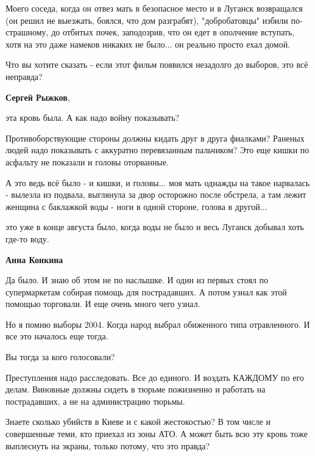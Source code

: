 \begin{itemize}
\begin{itemize}
Моего соседа, когда он отвез мать в безопасное место и в Луганск возвращался
(он решил не выезжать, боялся, что дом разграбят), "добробатовцы" избили
по-страшному, до отбитых почек, заподозрив, что он едет в ополчение вступать,
хотя на это даже намеков никаких не было... он реально просто ехал домой. 

Что вы хотите сказать - если этот фильм появился незадолго до выборов, это всё
неправда?

 
\textbf{Сергей Рыжков}, 

эта кровь была. А как надо войну показывать?

Противоборствующие стороны должны кидать друг в друга фиалками? Раненых людей
надо показывать с аккуратно перевязанным пальчиком? Это еще кишки по асфальту
не показали и головы оторванные. 

А это ведь всё было - и кишки, и головы... моя мать однажды на такое нарвалась
- вылезла из подвала, выглянула за двор осторожно после обстрела, а там лежит
женщина с баклажкой воды - ноги в одной стороне, голова в другой... 

это уже в конце августа было, когда воды не было и весь Луганск добывал хоть
где-то воду.

 
\textbf{Анна Конкина} 

Да было. И знаю об этом не по наслышке. И один из первых стоял по супермаркетам
собирая помощь для пострадавших. А потом узнал как этой помощью торговали. И
еще очень много чего узнал.

Но я помню выборы 2004. Когда народ выбрал обиженного типа отравленного. И все
это началось еще тогда.

Вы тогда за кого голосовали?

Преступления надо расследовать. Все до единого. И воздать КАЖДОМУ по его делам.
Виновные должны сидеть в тюрьме пожизненно и работать на пострадавших, а не на
администрацию тюрьмы.

Знаете сколько убийств в Киеве и с какой жестокостью? В том числе и совершенные
теми, кто приехал из зоны АТО. А может быть всю эту кровь тоже выплеснуть на
экраны, только потому, что это правда?


\end{itemize}
\end{itemize}

